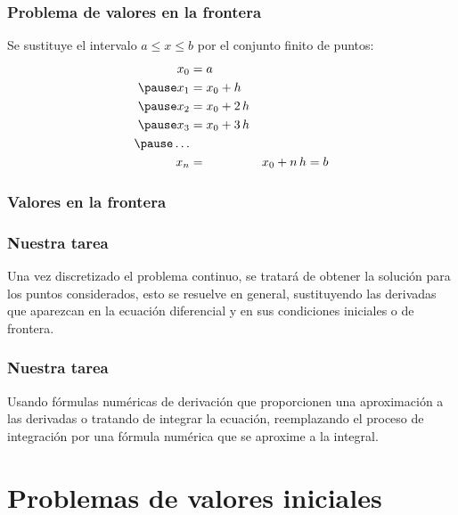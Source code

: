 \documentclass[12pt]{beamer}
\begin{document}
\begin{frame}
\frametitle{Problema de valores en la frontera}
Se sustituye el intervalo $a \leq x \leq b $ por el conjunto finito de puntos:
\pause
\begin{eqnarray*}
\begin{aligned}
x_{0} & = a \\ \pause
x_{1} & = x_{0} + h \\ \pause
x_{2} & = x_{0} + 2 \, h \\ \pause
x_{3} & = x_{0} + 3 \, h \\ \pause
\ldots \\
x_{n} & = & x_{0} + n \, h = b
\end{aligned}
\end{eqnarray*}
\end{frame}
\begin{frame}[fragile]
\frametitle{Valores en la frontera}
\end{frame}
\begin{frame}
\frametitle{Nuestra tarea}
Una vez discretizado el problema continuo, se tratará de obtener la solución para los puntos considerados, esto se resuelve en general, sustituyendo las derivadas que aparezcan en la ecuación diferencial y en sus condiciones iniciales o de frontera.
\end{frame}
\begin{frame}
\frametitle{Nuestra tarea}
Usando fórmulas numéricas de derivación que proporcionen una aproximación a las derivadas o tratando de integrar la ecuación, reemplazando el proceso de integración por una fórmula numérica que se aproxime a la integral.
\end{frame}

\section{Problemas de valores iniciales}
\end{document}
